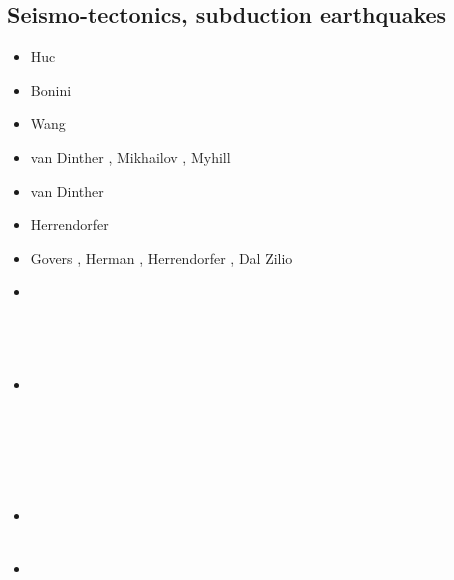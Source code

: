 \subsection{Seismo-tectonics, subduction earthquakes}

\begin{scriptsize}
\begin{itemize}
\item[\nineteenninetyeight] Huc \etal \cite{huhc98}
\item[\twothousandthree] Bonini \etal \cite{bocs03}
\item[\twothousandtwelve] Wang \etal \cite{wahh12}
\item[\twothousandthirteen] van Dinther \etal \cite{vagd13a,vagd13b}, Mikhailov \cite{milp13},
                            Myhill \cite{myhi13}
\item[\twothousandfourteen] van Dinther \etal \cite{vamd14}
\item[\twothousandfifteen] Herrendorfer \etal \cite{hevg15}
\item[\twothousandeighteen] Govers \etal \cite{gofv18}, Herman \etal \cite{hefg18}, 
                            Herrendorfer \etal \cite{hegv18}, Dal Zilio \etal \cite{davg18}
\item[\twothousandnineteen] 
\textcite{vawg19} \\ 
\textcite{vanzelst} \\
\textcite{vakf19} \\
\textcite{davg19} \\
\item[\twothousandtwenty] 
\textcite{brvf20} \\
\textcite{pegy20} \\
\textcite{dadm20} \\
\textcite{mabb20} \\
\textcite{hego20} \\
\textcite{soca20} \\
\item[\twothousandtwentyone] 
\textcite{jamp21} \\
\textcite{begc21} \\
\item[\twothousandtwentytwo] 
\textcite{toyp22} \\
\textcite{dage22} \\
\textcite{dala22} 
\end{itemize}
\end{scriptsize}

